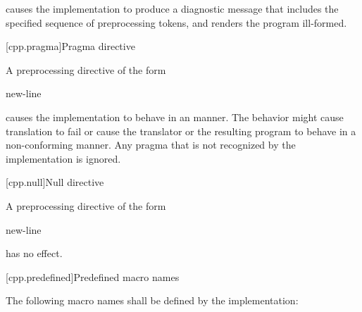 causes the implementation to produce
a diagnostic message that includes the specified sequence of preprocessing tokens,
and renders the program ill-formed.

[cpp.pragma]{Pragma directive}%
%

\pnum
A preprocessing directive of the form

\begin{ncsimplebnf}
  new-line
\end{ncsimplebnf}

causes the implementation to behave
in an  manner.
The behavior might cause translation to fail or cause the translator or
the resulting program to behave in a non-conforming manner.
Any pragma that is not recognized by the implementation is ignored.

[cpp.null]{Null directive}%

\pnum
A preprocessing directive of the form

\begin{ncsimplebnf}
\terminal{\#} new-line
\end{ncsimplebnf}

has no effect.

[cpp.predefined]{Predefined macro names}
%

\pnum
The following macro names shall be defined by the implementation:

